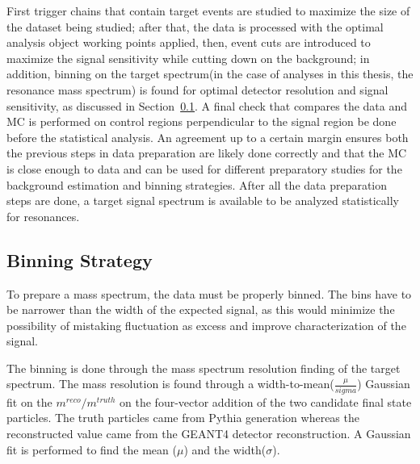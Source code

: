 First trigger chains that contain target events are studied to maximize the size of the dataset being studied; after that, the data is processed with the optimal analysis object working points applied, then, event cuts are introduced to maximize the signal sensitivity while cutting down on the background; in addition, binning on the target spectrum(in the case of analyses in this thesis, the resonance mass spectrum) is found for optimal detector resolution and signal sensitivity, as discussed in
Section~\ref{sec:binning}. A final check that compares the data and MC is performed on control regions perpendicular to the signal region be done before the statistical analysis. An agreement up to a certain margin ensures both the previous steps in data preparation are likely done correctly and that the MC is close enough to data and can be used for different preparatory studies for the background estimation and binning strategies. After all the data preparation steps are done, a target signal spectrum is available to be analyzed statistically for resonances. 

\subsection{Binning Strategy} 
\label{sec:binning}

To prepare a mass spectrum, the data must be properly binned. The bins have to be narrower than the width of the expected signal, as this would minimize the possibility of mistaking fluctuation as excess and improve characterization of the signal.

The binning is done through the mass spectrum resolution finding of the target spectrum. The mass resolution is found through a width-to-mean($\frac{\mu}{sigma}$) Gaussian fit on the $m^{reco}/m^{truth}$ on the four-vector addition of the two candidate final state particles. The truth particles came from Pythia generation whereas the reconstructed value came from the GEANT4 detector reconstruction. A Gaussian fit is performed to find the mean ($\mu$) and the width($\sigma$).


